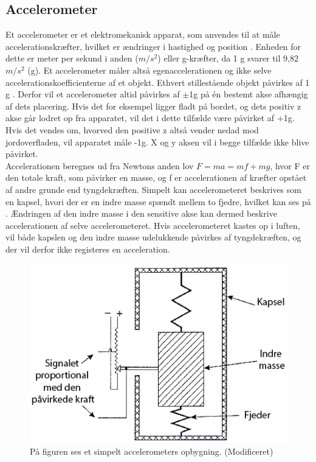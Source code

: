 \subsection{Accelerometer}
Et accelerometer er et elektromekanisk apparat, som anvendes til at måle accelerationskræfter, hvilket er ændringer i hastighed og position \citep{Goodrich2013,TittertonWeston2004}. Enheden for dette er meter per sekund i anden ($m/s^2$) eller g-kræfter, da 1 g svarer til 9,82$m/s^2$ (g). Et accelerometer måler altså egenaccelerationen og ikke selve accelerationskoefficienterne af et objekt. \citep{Sparkfun,TittertonWeston2004} Ethvert stillestående objekt påvirkes af 1 g \citep{Serway2010}. Derfor vil et accelerometer altid påvirkes af $\pm$1g på én bestemt akse afhængig af dets placering. Hvis det for eksempel ligger fladt på bordet, og dets positiv z akse går lodret op fra apparatet, vil det i dette tilfælde være påvirket af +1g. Hvis det vendes om, hvorved den positive z altså vender nedad mod jordoverfladen, vil apparatet måle -1g. X og y aksen vil i begge tilfælde ikke blive påvirket. \\
Accelerationen beregnes ud fra Newtons anden lov $F=ma=mf+mg$, hvor F er den totale kraft, som påvirker en masse, og f er accelerationen af kræfter opstået af andre grunde end tyngdekræften.\citep{TittertonWeston2004,Academic2016d} \newline
Simpelt kan accelerometeret beskrives som en kapsel, hvori der er en indre masse spændt mellem to fjedre, hvilket kan ses på . Ændringen af den indre masse i den sensitive akse kan dermed beskrive accelerationen af selve accelerometeret. Hvis accelerometeret kastes op i luften, vil både kapslen og den indre masse udelukkende påvirkes af tyngdekræften, og der vil derfor ikke registeres en acceleration.\citep{TittertonWeston2004,Academic2016d} \newline

\begin{figure}[H]
	\centering
	\includegraphics[scale=0.5]{figures/bProblemloesning/accelerometer_basic.png}
	\caption{På figuren ses et simpelt accelerometers opbygning. \citep{TittertonWeston2004}(Modificeret)}
	\label{acc_simpelt}
\end{figure}


